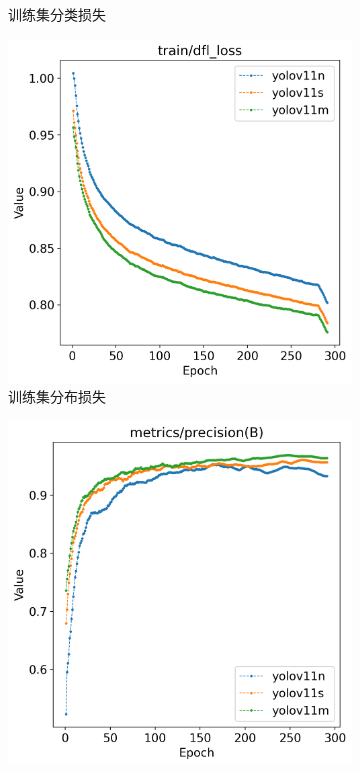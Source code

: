 \begin{figure}[H]
\begin{subfigure}[t]{0.43\textwidth}
        \caption{训练集分类损失}
        \label{fig:track_train_cls_loss}
    \end{subfigure}
    \begin{subfigure}[t]{0.43\textwidth}
        \centering
        \includegraphics[width=\textwidth]{figs/chap04/track_result/track_train_dfl_loss.png}
        \caption{训练集分布损失}
        \label{fig:track_train_dfl_loss}
    \end{subfigure}
    \begin{subfigure}[t]{0.43\textwidth}
        \centering
        \includegraphics[width=\textwidth]{figs/chap04/track_result/track_metrics_precision(B).png}

\end{subfigure}
\end{figure}
